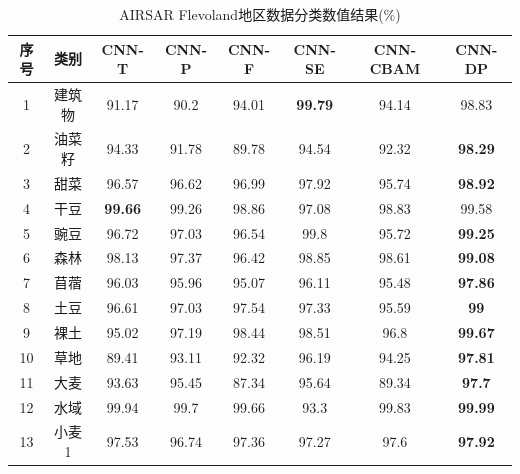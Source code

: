 \begin{table}[ht!]
    \caption{AIRSAR Flevoland地区数据分类数值结果(\%)}
    \label{tab:fle_result}
    \renewcommand\arraystretch{1.0}
    \begin{tabular}{cccccccc}
        \toprule[1.5bp]
        序号                        & 类别    & CNN-T          & CNN-P & CNN-F & CNN-SE         & CNN-CBAM       & CNN-DP         \\
        \midrule[0.75bp]
        1                         & 建筑物   & 91.17          & 90.2  & 94.01 & \textbf{99.79} & 94.14          & 98.83          \\
        2                         & 油菜籽   & 94.33          & 91.78 & 89.78 & 94.54          & 92.32          & \textbf{98.29} \\
        3                         & 甜菜    & 96.57          & 96.62 & 96.99 & 97.92          & 95.74          & \textbf{98.92} \\
        4                         & 干豆    & \textbf{99.66} & 99.26 & 98.86 & 97.08          & 98.83          & 99.58          \\
        5                         & 豌豆    & 96.72          & 97.03 & 96.54 & 99.8           & 95.72          & \textbf{99.25} \\
        6                         & 森林    & 98.13          & 97.37 & 96.42 & 98.85          & 98.61          & \textbf{99.08} \\
        7                         & 苜蓿    & 96.03          & 95.96 & 95.07 & 96.11          & 95.48          & \textbf{97.86} \\
        8                         & 土豆    & 96.61          & 97.03 & 97.54 & 97.33          & 95.59          & \textbf{99}    \\
        9                         & 裸土    & 95.02          & 97.19 & 98.44 & 98.51          & 96.8           & \textbf{99.67} \\
        10                        & 草地    & 89.41          & 93.11 & 92.32 & 96.19          & 94.25          & \textbf{97.81} \\
        11                        & 大麦    & 93.63          & 95.45 & 87.34 & 95.64          & 89.34          & \textbf{97.7}  \\
        12                        & 水域    & 99.94          & 99.7  & 99.66 & 93.3           & 99.83          & \textbf{99.99} \\
        13                        & 小麦 1  & 97.53          & 96.74 & 97.36 & 97.27          & 97.6           & \textbf{97.92} \\

\end{tabular}
\end{table}
